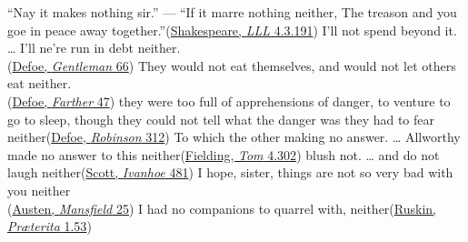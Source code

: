 \ea \label{ex:10-96}
\ea
``Nay it makes nothing sir.'' --- ``If it marre nothing neither, The treason and you goe in peace away together.''\hfill(\href{https://internetshakespeare.uvic.ca/doc/LLL_F1/scene/4.3/index.html#tln-1530}{Shakespeare, \textit{LLL} 4.3.191}) %
\ex
I'll not spend beyond it. {\dots} I'll ne're run in debt neither.\\\hfill(\href{https://ia800900.us.archive.org/29/items/compleatenglishg00deforich/compleatenglishg00deforich.pdf}{Defoe, \textit{Gentleman} 66}) %
\ex
They would not eat themselves, and would not let others eat neither.\\\hfill(\href{https://archive.org/details/fartheradventure00defo/page/44/mode/2up?q=%22would+not+eat%22&view=theater}{Defoe, \textit{Farther} 47})
\ex
they were too full of apprehensions of danger, to venture to go to sleep, though they could not tell what the danger was they had to fear neither\hfill(\href{https://archive.org/details/lifeandstranges00dobsgoog/page/n337/mode/2up?q=%22they+were+too+full+of%22&view=theater}{Defoe, \textit{Robinson} 312}) %
\ex
To which the other making no answer. {\dots} Allworthy made no answer to this neither\hfill(\href{https://archive.org/details/bim_eighteenth-century_the-history-of-tom-jones_fielding-henry_1768_4/page/302/mode/2up?q=%22to+which+the+other%22&view=theater}{Fielding, \textit{Tom} 4.302})
\ex
blush not. {\dots} and do not laugh neither\hfill(\href{https://archive.org/details/scottsivanhoeedi0000amar/page/590/mode/2up?q=%22and+do+not+laugh%22&view=theater}{Scott, \textit{Ivanhoe} 481})
\ex
I hope, sister, things are not so very bad with you neither\\\hfill(\href{https://archive.org/details/mansfieldpark00aust_1/page/22/mode/2up?q=%22things+are+not+so+very+bad%22&view=theater}{Austen, \textit{Mansfield} 25}) %
\ex
I had no companions to quarrel with, neither\hfill(\href{https://archive.org/details/praeterita01rusk/page/52/mode/2up?view=theater&q=%22companions+to+quarrel%22}{Ruskin, \textit{Præterita} 1.53})
\ex

